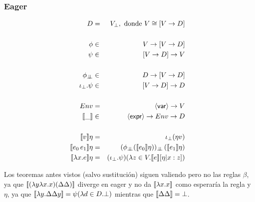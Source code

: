     \subsubsection{Eager}
      \begin{eqnarray*}
        D &=& V_\bot, \text{ donde } V \cong [V \to D] \\ \\
        \phi &\in& V \to [V \to D] \\
        \psi &\in& [V \to D] \to V \\ \\
        \phi_{\botbot} &\in& D \to [V \to D] \\
        \iota_\bot . \psi &\in& [V \to D] \to D \\ \\
        Env &=& \var \to V \\
        \llbracket\_\rrbracket &\in& \expr \to Env \to D \\ \\
        \llbracket v\rrbracket\eta &=& \iota_\bot (\eta v) \\
        \llbracket e_0\, e_1\rrbracket\eta &=& (\phi_{\botbot} (\llbracket e_0\rrbracket\eta))_{\botbot}\, (\llbracket e_1\rrbracket\eta)\\
        \llbracket\lambda x.e\rrbracket\eta &=& (\iota_\bot . \psi)(\lambda z \in V. \llbracket e\rrbracket[\eta|x:z])
      \end{eqnarray*}

      \PN Los teoremas antes vistos (salvo sustitución) siguen valiendo pero no las reglas $\beta$, ya que $[\![(\lambda y \lambda x.x)(\Delta \Delta)]\!]$ diverge en eager y no da $[\![\lambda x. x]\!]$ como esperaría la regla y $\eta$, ya que $[\![\lambda y. \Delta\Delta y]\!] = \psi(\lambda d \in D.\bot)$ mientras que $[\![\Delta\Delta]\!] = \bot$.